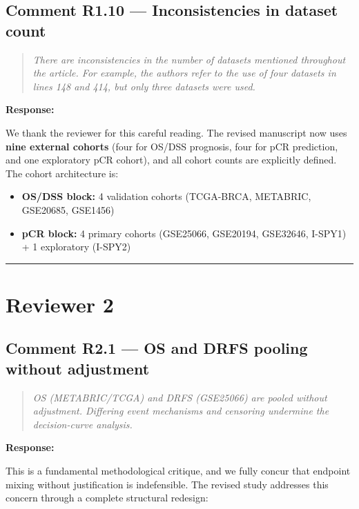 \documentclass[11pt]{article}
\newcommand{\reviewerquote}[1]{\begin{quote}\itshape #1\end{quote}}
\begin{document}
\subsection*{Comment R1.10 --- Inconsistencies in dataset count}

\reviewerquote{There are inconsistencies in the number of datasets mentioned throughout the article. For example, the authors refer to the use of four datasets in lines 148 and 414, but only three datasets were used.}

\noindent\textbf{Response:}

We thank the reviewer for this careful reading. The revised manuscript now uses \textbf{nine external cohorts} (four for OS/DSS prognosis, four for pCR prediction, and one exploratory pCR cohort), and all cohort counts are explicitly defined. The cohort architecture is:

\begin{itemize}
  \item \textbf{OS/DSS block:} 4 validation cohorts (TCGA-BRCA, METABRIC, GSE20685, GSE1456)
  \item \textbf{pCR block:} 4 primary cohorts (GSE25066, GSE20194, GSE32646, I-SPY1) + 1 exploratory (I-SPY2)
\end{itemize}

\bigskip\hrule\bigskip

\section*{Reviewer 2}

\subsection*{Comment R2.1 --- OS and DRFS pooling without adjustment}

\reviewerquote{OS (METABRIC/TCGA) and DRFS (GSE25066) are pooled without adjustment. Differing event mechanisms and censoring undermine the decision-curve analysis.}

\noindent\textbf{Response:}

This is a fundamental methodological critique, and we fully concur that endpoint mixing without justification is indefensible. The revised study addresses this concern through a complete structural redesign:
\end{document}
